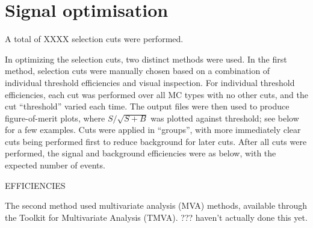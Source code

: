 \documentclass[12pt]{thesis}  %
\begin{document}
\pagebreak

\chapter{Signal optimisation}

A total of XXXX selection cuts were performed.

In optimizing the selection cuts, two distinct methods were used. In the first method, selection cuts were manually chosen based on a combination of individual threshold efficiencies and visual inspection. For individual threshold efficiencies, each cut was performed over all MC types with no other cuts, and the cut ``threshold'' varied each time. The output files were then used to produce figure-of-merit plots, where $S/\sqrt{S+B}$ was plotted against threshold; see below for a few examples. Cuts were applied in ``groups'', with more immediately clear cuts being performed first to reduce background for later cuts. After all cuts were performed, the signal and background efficiencies were as below, with the expected number of events.

EFFICIENCIES

The second method used multivariate analysis (MVA) methods, available through the Toolkit for Multivariate Analysis (TMVA). ??? haven't actually done this yet.

\pagebreak
\end{document}
